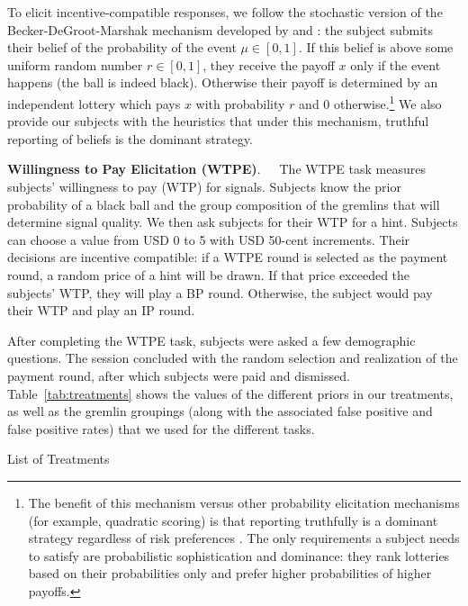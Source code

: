 \documentclass[12pt,a4paper]{article}
\begin{document}
To elicit incentive-compatible responses, we follow the stochastic version of the Becker-DeGroot-Marshak mechanism developed by \citet{grether_testing_1992} and \citet{holt_update_2009}: the subject submits their belief of the probability of the event $\mu \in [0,1]$. If this belief is above some uniform random number $r\in[0,1]$, they receive the payoff $x$ only if the event happens (the ball is indeed black). Otherwise their payoff is determined by an independent lottery which pays $x$ with probability $r$ and 0 otherwise.\footnote{The benefit of this mechanism versus other probability elicitation mechanisms (for example, quadratic scoring) is that reporting truthfully is a dominant strategy regardless of risk preferences \citep{karni_mechanism_2009-1}. The only requirements a subject needs to satisfy are probabilistic sophistication and dominance: they rank lotteries based on their probabilities only and prefer higher probabilities of higher payoffs.} We also provide our subjects with the heuristics that under this mechanism, truthful reporting of beliefs is the dominant strategy.

\bigskip
\noindent\textbf{Willingness to Pay Elicitation (WTPE)}.\ \ \ The WTPE task measures subjects' willingness to pay (WTP) for signals. Subjects know the prior probability of a black ball and the group composition of the gremlins that will determine signal quality.  We then ask subjects for their WTP for a hint. Subjects can choose a value from USD 0 to 5 with USD 50-cent increments. Their decisions are incentive compatible: if a WTPE round is selected as the payment round, a random price of a hint will be drawn. If that price exceeded the subjects' WTP, they will play a BP round. Otherwise, the subject would pay their WTP and play an IP round.  

\vspace{10pt} 

After completing the WTPE task, subjects were asked a few demographic questions. The session concluded with the random selection and realization of the payment round, after which subjects were paid and dismissed. Table~\ref{tab:treatments} shows the values of the different priors in our treatments, as well as the gremlin groupings (along with the associated false positive and false positive rates) that we used for the different tasks.

\begin{table}[h!]
\caption{List of Treatments} \label{tab:treatments}

\end{table}
\end{document}
